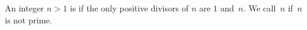 



\begin{definition}\label{defn:prime_composite}
An integer $n>1$ is  if the only positive
divisors of $n$ are $1$ and~$n$.
We call~$n$  if~$n$ is not prime.
\end{definition}


